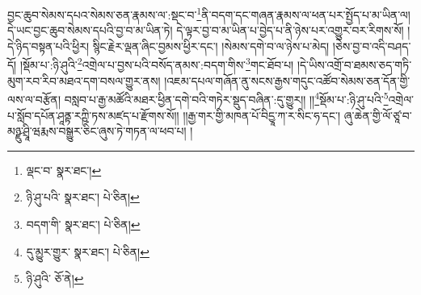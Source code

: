 བྱང་ཆུབ་སེམས་དཔའ་སེམས་ཅན་རྣམས་ལ་:སྡང་བ་\footnote{ལྡང་བ་  སྣར་ཐང་། }ནི་བདག་དང་གཞན་རྣམས་ལ་ཕན་པར་སྤྱོད་པ་མ་ཡིན་ལ། དེ་ཡང་བྱང་ཆུབ་སེམས་དཔའི་བྱ་བ་མ་ཡིན་ཏེ། དེ་ལྟར་བྱ་བ་མ་ཡིན་པ་བྱེད་པ་ནི་ཉེས་པར་འགྱུར་བར་རིགས་སོ། །དེ་ཉིད་བསྟན་པའི་ཕྱིར། སྙིང་རྗེར་ལྡན་ཞིང་བྱམས་ཕྱིར་དང་། །སེམས་དགེ་བ་ལ་ཉེས་པ་མེད། །ཅེས་བྱ་བ་འདི་བཤད་དོ། །སྡོམ་པ་:ཉི་ཤུའི་\footnote{ཉི་ཤུ་པའི་  སྣར་ཐང་།  པེ་ཅིན། }འགྲེལ་པ་བྱས་པའི་བསོད་ནམས་:བདག་གིས་\footnote{བདག་གི་  སྣར་ཐང་།  པེ་ཅིན། }གང་ཐོབ་པ། །དེ་ཡིས་འགྲོ་བ་ཐམས་ཅད་གཏི་མུག་རབ་རིབ་མཐའ་དག་བསལ་གྱུར་ནས། །འཇམ་དཔལ་གཞོན་ནུ་སངས་རྒྱས་གདུང་འཚོབ་སེམས་ཅན་དོན་གྱི་ལས་ལ་བརྩོན། བསླབ་པ་རྒྱ་མཚོའི་མཐར་ཕྱིན་དགེ་བའི་གཏེར་སྡུད་བཞིན་:དུ་གྱུར།། །།\footnote{དུ་མྱུར་གྱུར་  སྣར་ཐང་།  པེ་ཅིན། }སྡོམ་པ་:ཉི་ཤུ་པའི་\footnote{ཉི་ཤུའི་  ཅོ་ནེ། }འགྲེལ་པ་སློབ་དཔོན་ཤཱནྟ་རཀྵི་ཏས་མཛད་པ་རྫོགས་སོ།། །།རྒྱ་གར་གྱི་མཁན་པོ་བིདྱཱ་ཀ་ར་སིང་ཧ་དང་། ཞུ་ཆེན་གྱི་ལོ་ཙཱ་བ་མཉྫུ་ཤྲཱི་ཝརྨས་བསྒྱུར་ཅིང་ཞུས་ཏེ་གཏན་ལ་ཕབ་པ། ། 